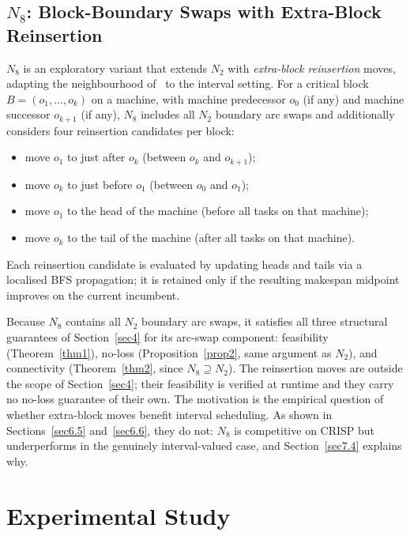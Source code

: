 \documentclass[preprint,12pt]{elsarticle}
\begin{document}
\subsection{$N_8$: Block-Boundary Swaps with Extra-Block Reinsertion}
\label{sec5.5}

$N_8$ is an exploratory variant that extends $N_2$ with \emph{extra-block reinsertion} moves, adapting the neighbourhood of~\cite{Xie2022} to the interval setting. For a critical block $B = (o_1,\ldots,o_k)$ on a machine, with machine predecessor $o_0$ (if any) and machine successor $o_{k+1}$ (if any), $N_8$ includes all $N_2$ boundary arc swaps and additionally considers four reinsertion candidates per block:
\begin{itemize}
\item move $o_1$ to just after $o_k$ (between $o_k$ and $o_{k+1}$);
\item move $o_k$ to just before $o_1$ (between $o_0$ and $o_1$);
\item move $o_1$ to the head of the machine (before all tasks on that machine);
\item move $o_k$ to the tail of the machine (after all tasks on that machine).
\end{itemize}
Each reinsertion candidate is evaluated by updating heads and tails via a localised BFS propagation; it is retained only if the resulting makespan midpoint improves on the current incumbent.

Because $N_8$ contains all $N_2$ boundary arc swaps, it satisfies all three structural guarantees of Section~\ref{sec4} for its arc-swap component: feasibility (Theorem~\ref{thm1}), no-loss (Proposition~\ref{prop2}, same argument as $N_2$), and connectivity (Theorem~\ref{thm2}, since $N_8 \supseteq N_2$). The reinsertion moves are outside the scope of Section~\ref{sec4}; their feasibility is verified at runtime and they carry no no-loss guarantee of their own. The motivation is the empirical question of whether extra-block moves benefit interval scheduling. As shown in Sections~\ref{sec6.5} and~\ref{sec6.6}, they do not: $N_8$ is competitive on CRISP but underperforms in the genuinely interval-valued case, and Section~\ref{sec7.4} explains why.


\section{Experimental Study}
\label{sec6}
\end{document}
